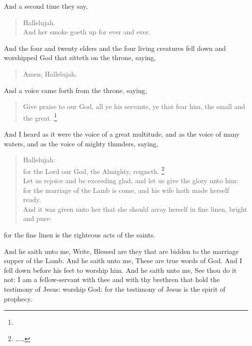 \noindent
{} And a second time they say,
\begin{verse}
Hallelujah.\\
And her smoke goeth up for ever and ever.%
\end{verse}
 And the four and twenty elders and the four living creatures fell down and worshipped God that sitteth on the throne, saying, 
\begin{verse}
Amen; Hallelujah. 
\end{verse}
 And a voice came forth from the throne, saying,
\begin{verse}
Give praise to our God, all ye his servants, ye that fear him, the small and the great.%
	\footnote{}
\end{verse}
 And I heard as it were the voice of a great multitude, and as the voice of many waters, and as the voice of mighty thunders, saying,
\begin{verse}
Hallelujah:\\
for the Lord our God, the Almighty, reigneth.%
	\footnote{\ldots {}\ldots \cbibler}\\
Let us rejoice and be exceeding glad, and let us give the glory unto him:\\
for the marriage of the Lamb is come, and his wife hath made herself ready.\\
And it was given unto her that she should array herself in fine linen, bright and pure:
\end{verse}
for the fine linen is the righteous acts of the saints.

 And he saith unto me, Write, Blessed are they that are bidden to the marriage supper of the Lamb. And he saith unto me, These are true words of God. 
 And I fell down before his feet to worship him. And he saith unto me, See thou do it not: I am a fellow-servant with thee and with thy brethren that hold the testimony of Jesus: worship God: for the testimony of Jesus is the spirit of prophecy.

